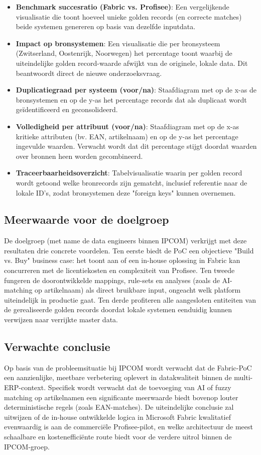 \begin{itemize}
  \item \textbf{Benchmark succesratio (Fabric vs. Profisee)}: Een vergelijkende visualisatie die toont hoeveel unieke golden records (en correcte matches) beide systemen genereren op basis van dezelfde inputdata.
  \item \textbf{Impact op bronsystemen}: Een visualisatie die per bronsysteem (Zwitserland, Oostenrijk, Noorwegen) het percentage toont waarbij de uiteindelijke golden record-waarde afwijkt van de originele, lokale data. Dit beantwoordt direct de nieuwe onderzoeksvraag.
  \item \textbf{Duplicatiegraad per systeem (voor/na)}: Staafdiagram met op de x-as de bronsystemen en op de y-as het percentage records dat als duplicaat wordt geïdentificeerd en geconsolideerd.
  \item \textbf{Volledigheid per attribuut (voor/na)}: Staafdiagram met op de x-as kritieke attributen (bv. EAN, artikelnaam) en op de y-as het percentage ingevulde waarden. Verwacht wordt dat dit percentage stijgt doordat waarden over bronnen heen worden gecombineerd.
  \item \textbf{Traceerbaarheidsoverzicht}: Tabelvisualisatie waarin per golden record wordt getoond welke bronrecords zijn gematcht, inclusief referentie naar de lokale ID's, zodat bronsystemen deze "foreign keys" kunnen overnemen.
\end{itemize}

\subsection{Meerwaarde voor de doelgroep}
De doelgroep (met name de data engineers binnen IPCOM) verkrijgt met deze resultaten drie concrete voordelen. Ten eerste biedt de PoC een objectieve "Build vs. Buy" business case: het toont aan of een in-house oplossing in Fabric kan concurreren met de licentiekosten en complexiteit van Profisee. Ten tweede fungeren de doorontwikkelde mappings, rule-sets en analyses (zoals de AI-matching op artikelnaam) als direct bruikbare input, ongeacht welk platform uiteindelijk in productie gaat. Ten derde profiteren alle aangesloten entiteiten van de gerealiseerde golden records doordat lokale systemen eenduidig kunnen verwijzen naar verrijkte master data.

\subsection{Verwachte conclusie}
Op basis van de probleemsituatie bij IPCOM wordt verwacht dat de Fabric-PoC een aanzienlijke, meetbare verbetering oplevert in datakwaliteit binnen de multi-ERP-context. Specifiek wordt verwacht dat de toevoeging van AI of fuzzy matching op artikelnamen een significante meerwaarde biedt bovenop louter deterministische regels (zoals EAN-matches). De uiteindelijke conclusie zal uitwijzen of de in-house ontwikkelde logica in Microsoft Fabric kwalitatief evenwaardig is aan de commerciële Profisee-pilot, en welke architectuur de meest schaalbare en kostenefficiënte route biedt voor de verdere uitrol binnen de IPCOM-groep.